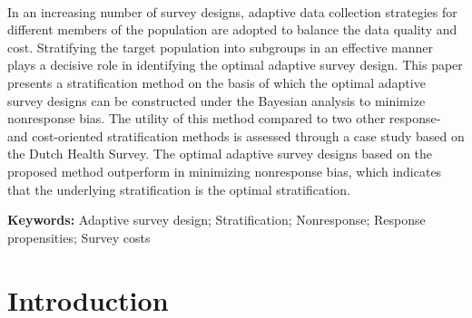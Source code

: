 \documentclass[12pt]{article}
\makeatletter
\renewenvironment{abstract} {\vspace*{-1pc}\trivlist\item[]\leftskip\oupIndent\par\vskip4pt\noindent\textbf{\abstractname}\mbox{\null}\\\relax}{\par\noindent\endtrivlist}
\def\author#1{\gdef\@author{\hskip-\dimexpr(\tabcolsep)\hskip\oupIndent\parbox{\dimexpr\textwidth-\oupIndent}{\centering\raggedright\bfseries#1}}}
\def\title#1{\gdef\@title{\centering\raggedright\bfseries\ifx\@articleType\@empty\else\@articleType\\\fi#1}}
\let\@articleType\@empty \def\articletype#1{\gdef\@articleType{{\normalfont\itshape#1}}}
\makeatother
\begin{document}
\title{Optimal Stratification in Bayesian Adaptive Survey Designs}
\author{\textbf{\fontsize{14pt}{16.4pt}\selectfont{Yongchao Ma}}~\\\normalsize\normalfont {Department of Methodology and Statistics\unskip, Faculty of Social and Behavioral Sciences\unskip, Utrecht University\unskip, Heidelberglaan 8\unskip, Utrecht\unskip, 3584 CS\unskip, The Netherlands}~\\{\normalsize\normalfont  E-mail: y.ma1@uu.nl}}
\def\RunningHead{{Optimal Stratification in Bayesian Adaptive Survey Designs}}

\maketitle 
\acknote{}

\begin{abstract}
In an increasing number of survey designs, adaptive data collection strategies for different members of the population are adopted to balance the data quality and cost.
Stratifying the target population into subgroups in an effective manner plays a decisive role in identifying the optimal adaptive survey design.
This paper presents a stratification method on the basis of which the optimal adaptive survey designs can be constructed under the Bayesian analysis to minimize nonresponse bias.
The utility of this method compared to two other response- and cost-oriented stratification methods is assessed through a case study based on the Dutch Health Survey.
The optimal adaptive survey designs based on the proposed method outperform in minimizing nonresponse bias, which indicates that the underlying stratification is the optimal stratification.


\end{abstract}\def\keywordstitle{Keywords}

\smallskip\noindent\textbf{Keywords: }{Adaptive survey design; Stratification; Nonresponse; Response propensities; Survey costs}
    
\clearpage

\section{Introduction}
\label{sec:introduction}

\end{document}
